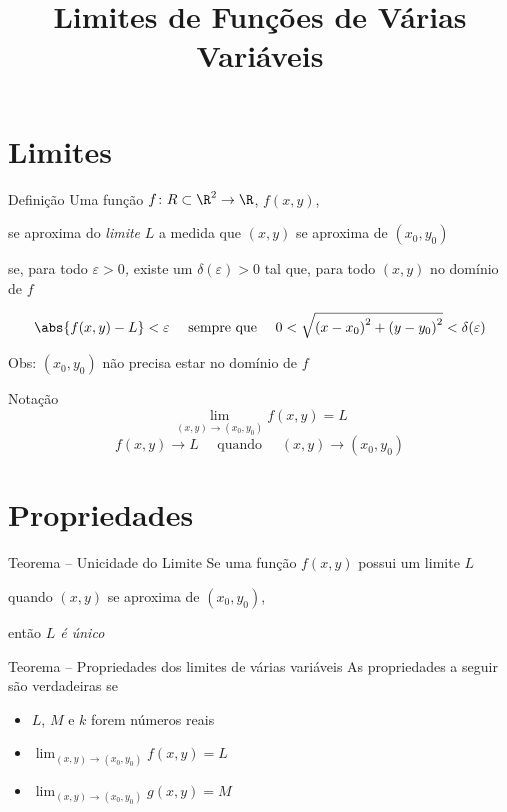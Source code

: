 \documentclass[fleqn,utf8,aspectratio=169,12pt,ignorenonframetext]{beamer}
\title{Limites de Funções de Várias Variáveis}
\begin{document}
\addtitle

\section{Limites}

\begin{frame}{Definição}
  Uma função
  \(f\colon R \subset \R^2 \to \R\), \;
  \pause
  \(f(x, y)\),

  \pause
  se aproxima do \emph{limite} $L$
  a medida que \((x, y)\) se aproxima de \((x_0, y_0)\)

  \pause
  se, para todo \emph{$\varepsilon>0$,}
  \pause
  existe um \emph{\(\delta(\varepsilon)>0\)}
  \pause
  tal que,
  \pause
  para todo \((x, y)\) no domínio de $f$

  \pause
  \[
    \abs{f(x, y)-L} < \varepsilon
    \quad\text{ sempre que }\quad
    0 < \sqrt{ \left(x-x_0\right)^2 + \left(y-y_0\right)^2 } < \delta(\varepsilon)
  \]

  \pause
  Obs: \((x_0, y_0)\) não precisa estar no domínio de $f$
\end{frame}

\begin{frame}{Notação}
  \[
    \lim_{(x, y)\to(x_0, y_0)} f(x, y) = L
  \]
  \pause
  \vspace{\baselineskip}
  \[
    f(x, y) \to L \quad\text{ quando }\quad (x, y)\to(x_0, y_0)
  \]
\end{frame}

\section{Propriedades}

\begin{frame}{Teorema -- Unicidade do Limite}
  Se uma função \(f(x, y)\) possui um limite $L$

  quando \((x, y)\) se aproxima de \((x_0, y_0)\),

  \pause
  então \emph{$L$ é único}
\end{frame}

\begin{frame}{Teorema -- Propriedades dos limites de várias variáveis}
  As propriedades a seguir são verdadeiras se
  \begin{itemize}[<+->]
    \setlength\itemsep{1.5em}
    \item $L$, $M$ e $k$ forem números reais
    \item \(\lim_{(x, y)\to(x_0, y_0)} f(x, y) = L\)
    \item \(\lim_{(x, y)\to(x_0, y_0)} g(x, y) = M\)
  \end{itemize}
\end{frame}
\end{document}
